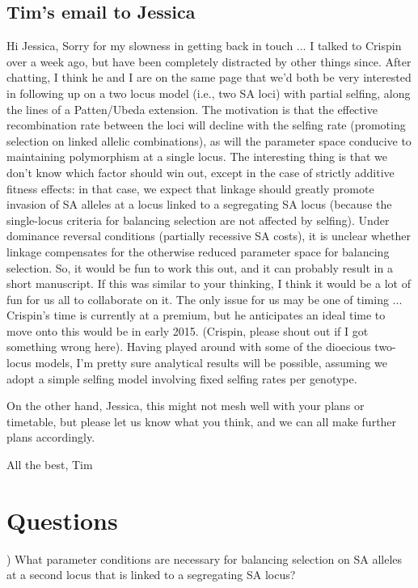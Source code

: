 \documentclass[11pt]{article}
\begin{document}
\subsection*{Tim's email to Jessica}
	Hi Jessica,
	Sorry for my slowness in getting back in touch ... I talked to Crispin over a week ago, but have been completely distracted by other things since. After chatting, I think he and I are on the same page that we'd both be very interested in following up on a two locus model (i.e., two SA loci) with partial selfing, along the lines of a Patten/Ubeda extension. The motivation is that the effective recombination rate between the loci will decline with the selfing rate (promoting selection on linked allelic combinations), as will the parameter space conducive to maintaining polymorphism at a single locus. The interesting thing is that we don't know which factor should win out, except in the case of strictly additive fitness effects: in that case, we expect that linkage should greatly promote invasion of SA alleles at a locus linked to a segregating SA locus (because the single-locus criteria for balancing selection are not affected by selfing). Under dominance reversal conditions (partially recessive SA costs), it is unclear whether linkage compensates for the otherwise reduced parameter space for balancing selection. So, it would be fun to work this out, and it can probably result in a short manuscript. If this was similar to your thinking, I think it would be a lot of fun for us all to collaborate on it. The only issue for us may be one of timing ... Crispin's time is currently at a premium, but he anticipates an ideal time to move onto this would be in early 2015. (Crispin, please shout out if I got something wrong here). Having played around with some of the dioecious two-locus models, I'm pretty sure analytical results will be possible, assuming we adopt a simple selfing model involving fixed selfing rates per genotype. 

	On the other hand, Jessica, this might not mesh well with your plans or timetable, but please let us know what you think, and we can all make further plans accordingly.

	All the best,
	Tim


\section*{Questions}
) What parameter conditions are necessary for balancing selection on SA alleles at a second locus that is linked to a segregating SA locus? \bigskip
\end{document}
